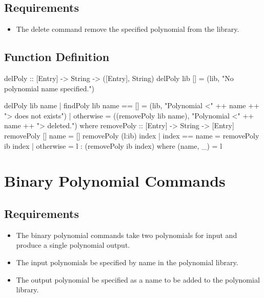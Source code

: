 \subsection{Requirements}
\begin{itemize}
\item The delete command  remove the specified polynomial from the library.
\end{itemize}
\subsection{Function Definition}
\begin{code}
delPoly :: [Entry] -> String -> ([Entry], String)
delPoly lib [] = (lib, "No polynomial name specified.")

delPoly lib name
  | findPoly lib name == [] = (lib, "Polynomial <" ++ name ++ "> does not exists")
  | otherwise               = ((removePoly lib name), "Polynomial <" ++ name ++ "> deleted.")
  where
    removePoly ::  [Entry] -> String -> [Entry]
    removePoly [] name = []
    removePoly (l:ib) index
      | index == name = removePoly ib index
      | otherwise     = l : (removePoly ib index)
      where
        (name, _) = l
\end{code}


\section{Binary Polynomial Commands}
\subsection{Requirements}
\begin{itemize}
\item The binary polynomial commands  take two polynomials for input and produce a single polynomial output.
\item The input polynomials  be specified by name in the polynomial library.
\item The output polynomial  be specified as a name to be added to the polynomial library.
\end{itemize}
